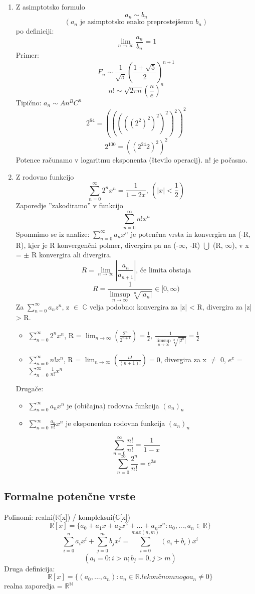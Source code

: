 \documentclass[a4paper,12pt]{article}
\theoremstyle{definition}
\theoremstyle{remark}
\newcommand{\N}{\mathbb{N}}
\newcommand{\R}{\mathbb{R}}
\newcommand{\C}{\mathbb{C}}
\begin{document}
\begin{enumerate}
    \item Z asimptotsko formulo\\
    \[a_n \sim b_n\] \[(a_n \text{ je asimptotsko enako preprostejšemu }b_n)\]
    po definiciji:\[\lim_{n \to \infty} \frac{a_n}{b_n} = 1\]
    Primer:
    \[F_n \sim \frac{1}{\sqrt{5}}(\frac{1 + \sqrt{5}}{2})^{n + 1}\]
    \[n! \sim \sqrt{2 \pi n}(\frac{n}{e})^n\]
    Tipično: $a_n \sim A n^B C^n$
    \[2^{64} = (((((2^2)^2)^2)^2)^2)^2\]
    \[2^{100} = ((2^{24}2)^2)^2\]
    Potence računamo v logaritmu eksponenta (število operacij). n! je počasno.
    \item Z rodovno funkcijo\\
    \[\sum_{n=0}^{\infty} 2^n x^n = \frac{1}{1 - 2x}, \ (|x| < \frac{1}{2})\]
    Zaporedje ''zakodiramo'' v funkcijo
    \[\sum_{n = 0}^{\infty} n! x^n\]
    Spomnimo se iz analize: $\sum_{n = 0}^{\infty} a_n x^n$ je potenčna vrsta in konvergira na (-R, R), kjer je R konvergenčni polmer, divergira pa na (-$\infty$, -R) $\bigcup$ (R, $\infty$), v x = $\pm$ R konvergira ali divergira.
    \[R = \lim_{n \to \infty} |\frac{a_n}{a_{n + 1}}| \text{, če limita obstaja}\]
    \[R = \frac{1}{\limsup\limits_{n \to \infty} \sqrt[n]{|a_n|}} \in [0, \infty)\]
    Za $\sum_{n = 0}^{\infty} a_n z^n$, z $\in$ $\C$ velja podobno: konvergira za |z| < R, divergira za |z| > R.
    \begin{itemize}
        \item $\sum_{n = 0}^{\infty} 2^n x^n$, R = $\lim_{n \to \infty} (\frac{2^n}{2^{n + 1}}) = \frac{1}{2}$, $\frac{1}{\limsup\limits_{n \to \infty} \sqrt[n]{|2^n|}} = \frac{1}{2}$
        \item $\sum_{n = 0}^{\infty} n! x^n$, R = $\lim_{n \to \infty} (\frac{n!}{(n + 1)!}) = 0$, divergira za x $\neq$ 0,  $e^x$ = $\sum_{n = 0}^{\infty} \frac{1}{n!} x^n$
    \end{itemize}
    Drugače:
    \begin{itemize}
        \item $\sum_{n = 0}^{\infty} a_n x^n$ je (običajna) rodovna funkcija $(a_n)_n$
        \item $\sum_{n = 0}^{\infty} \frac{a_n}{n!} x^n$ je eksponentna rodovna funkcija $(a_n)_n$
    \end{itemize}
    \[\sum_{n = 0}^{\infty} \frac{n!}{n!} = \frac{1}{1 - x}\]
    \[\sum_{n = 0}^{\infty} \frac{2^n}{n!} = e^{2x}\]
\end{enumerate}

\subsection{Formalne potenčne vrste}
Polinomi: realni($\R$[x]) / kompleksni($\C$[x])
\[\R [x] = \{a_0 + a_1 x + a_2 x^2 + ... + a_n x^n: a_0, ..., a_n \in \R\}\]
\[\sum_{i = 0}^n a_i x^{i} + \sum_{j = 0}^m b_j x^j = \sum_{i = 0}^{max(n, m)}(a_i + b_i)x^{i}\]
\[(a_i = 0: i > n; b_j = 0, j > m)\]
Druga definicija:
\[\R[x] = \{(a_0, ..., a_n): a_n \in \R. le končno mnogo a_n \neq 0\}\]
realna zaporedja = $\R^{\N}$
\end{document}
